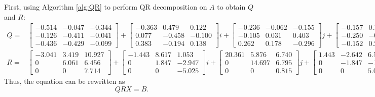 \documentclass[3p]{elsarticle}
\numberwithin{equation}{section}
\begin{document}
First, using Algorithm \ref{alg:QR} to perform QR decomposition on $A$ to obtain $Q$ and $R:$
\setlength{\jot}{2pt}
\setlength{\arraycolsep}{1pt}
{\footnotesize
\begin{align*}
  Q =
    & \begin{bmatrix}
    -0.514 & -0.047 & -0.344 \\
    -0.126 & -0.411 & -0.041 \\
    -0.436 & -0.429 & -0.099
    \end{bmatrix} +
    \begin{bmatrix}
    -0.363 &  0.479 &  0.122 \\
     0.077 & -0.458 & -0.100 \\
     0.383 & -0.194 &  0.138
    \end{bmatrix} i
    + 
    \begin{bmatrix}
    -0.236 & -0.062 & -0.155 \\
    -0.105 &  0.031 &  0.403 \\
     0.262 &  0.178 & -0.296
    \end{bmatrix} j +
    \begin{bmatrix}
    -0.157 &  0.171 &  0.319 \\
    -0.250 & -0.133 &  0.577 \\
    -0.152 &  0.291 & -0.343
    \end{bmatrix} k,\\
  R =
    & \begin{bmatrix}
    -3.041 & 3.419 & 10.927 \\
     0     & 6.061 & 6.456 \\
     0     & 0     & 7.714
    \end{bmatrix} +
    \begin{bmatrix}
    -1.443 & 8.617 &  1.053 \\
     0     & 1.847 & -2.947 \\
     0     & 0     & -5.025
    \end{bmatrix} i
    + 
    \begin{bmatrix}
    20.361 & 5.876  & 6.740 \\
     0     & 14.697 & 6.795 \\
     0     & 0      & 0.815
    \end{bmatrix} j +
    \begin{bmatrix}
    1.443 & -2.642 &  6.596 \\
    0     & -1.847 & -1.528 \\
    0     &  0     &  5.025
    \end{bmatrix} k.
\end{align*}
}
Thus, the equation can be rewritten as
\begin{equation}
    QRX = B.\label{eq:example1}
\end{equation}
\end{document}
